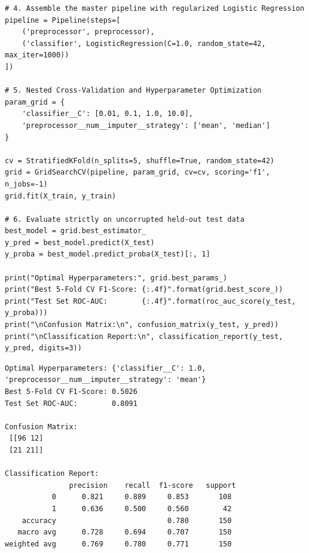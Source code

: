 \begin{lstlisting}[style=pythonstyle, caption={Leak-free machine learning pipeline with hyperparameter tuning.}, label={lst:production_pipeline}]
# 4. Assemble the master pipeline with regularized Logistic Regression
pipeline = Pipeline(steps=[
    ('preprocessor', preprocessor),
    ('classifier', LogisticRegression(C=1.0, random_state=42, max_iter=1000))
])

# 5. Nested Cross-Validation and Hyperparameter Optimization
param_grid = {
    'classifier__C': [0.01, 0.1, 1.0, 10.0],
    'preprocessor__num__imputer__strategy': ['mean', 'median']
}

cv = StratifiedKFold(n_splits=5, shuffle=True, random_state=42)
grid = GridSearchCV(pipeline, param_grid, cv=cv, scoring='f1', n_jobs=-1)
grid.fit(X_train, y_train)

# 6. Evaluate strictly on uncorrupted held-out test data
best_model = grid.best_estimator_
y_pred = best_model.predict(X_test)
y_proba = best_model.predict_proba(X_test)[:, 1]

print("Optimal Hyperparameters:", grid.best_params_)
print("Best 5-Fold CV F1-Score: {:.4f}".format(grid.best_score_))
print("Test Set ROC-AUC:        {:.4f}".format(roc_auc_score(y_test, y_proba)))
print("\nConfusion Matrix:\n", confusion_matrix(y_test, y_pred))
print("\nClassification Report:\n", classification_report(y_test, y_pred, digits=3))
\end{lstlisting}

\begin{lstlisting}[style=outputstyle, caption={Execution output of production pipeline.}]
Optimal Hyperparameters: {'classifier__C': 1.0, 'preprocessor__num__imputer__strategy': 'mean'}
Best 5-Fold CV F1-Score: 0.5026
Test Set ROC-AUC:        0.8091

Confusion Matrix:
 [[96 12]
 [21 21]]

Classification Report:
               precision    recall  f1-score   support
           0      0.821     0.889     0.853       108
           1      0.636     0.500     0.560        42
    accuracy                          0.780       150
   macro avg      0.728     0.694     0.707       150
weighted avg      0.769     0.780     0.771       150
\end{lstlisting}

